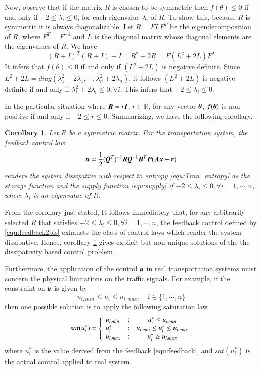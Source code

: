 \documentclass[preprint,authoryear,12pt]{elsarticle}
\renewcommand{\vec}[1]{\mbox{\boldmath$#1$}}
\newcommand{\mat}[1]{\mbox{\boldmath$#1$}}
\newtheorem{cor}{Corollary}
\begin{document}
Now, observe that if the matrix $R$ is chosen to be symmetric then $f(\theta)\leq 0$ if and only if $-2\leq\lambda_i\leq 0$, for each  eigenvalue $\lambda_i$  
 of $R$. To show this, because $R$ is symmetric it is always diagonalizable. Let $R=FLF^T$ be the eigendecomposition of $R$, where $F^T=F^{-1}$ and $L$ is the diagonal matrix whose diagonal elements are the  eigenvalues of $R$. We have 
 $$(R+I)^T(R+I)-I=R^2+2R=F(L^2+2L)F^T$$
It infers that $f(\theta)\leq 0$ if and only if $(L^2+2L)$ is negative definite. Since $L^2+2L=diag(\lambda_1^2+2\lambda_1,\cdots,\lambda_n^2+2\lambda_n)$, it follows $(L^2+2L)$ is negative definite if and only if  $\lambda_i^2+2\lambda_i \leq 0, \forall i $. This infers that  $-2\leq\lambda_i\leq 0$.

In the particular situation where $\mat{R}=r\mat{I}$, $r\in
\mathbb{R}$,
for any vector $\vec{\theta}$, $f(\vec{\theta})$ is non-positive if and only if $-2\leq r\leq 0$. Summarizing, we have the following corollary. 

\begin{cor}\label{thm:pbcc2} Let $R$ be a symmetric matrix. 
For the transportation system, the feedback control law
\begin{equation}
\label{equ:feedback2bis}
\vec{u}=\frac{1}{2}(\mat{Q}^T)^{-1}\mat{R}\mat{Q}^{-1}\mat{B}^T\mat{P}(\mat{A}
\vec{x}+\vec{r})
\end{equation}
renders the system dissipative with respect to
entropy \eqref{equ:Tran_entropy} as the storage function and the
supply function \eqref{equ:supply} if $-2\leq\lambda_i\leq 0,  \forall
i=1,\cdots,n$, where $\lambda_i$ is an eigenvalue of $R$.
 
\end{cor}

From the corollary just stated,  It follows immediately that, for any
arbitrarily selected $R$ that satisfies $-2\leq\lambda_i\leq 0,  \forall i=1,\cdots,n$, the feedback
control defined by \eqref{equ:feedback2bis} exhausts the class of control laws
which render the system dissipative. Hence, corollary \ref{thm:pbcc2} 
gives explicit but non-unique solutions of the the dissipativity based
control problem.

Furthermore, the application of the control $\vec{u}$ in real
transportation systems must concern the physical limitations on the
traffic signals. For example, if the constraint on $\vec{u}$ is given
by
$$u_{i,min}\le u_i\le u_{i,max},\quad i\in\{1,\cdots,n\}
$$
then one possible solution is to apply the following saturation law
\begin{equation}
sat(u_i^*) = \left\{ \begin{array}{l@{\quad:\quad}c}
        u_{i,min} & u_i^*\le u_{i,min}\\
        u_i^* & u_{i,min}\le u_i^*\le u_{i,max}\\
        u_{i,max} & u_i^*\ge u_{i,max}
        \end{array}\right.
\end{equation}
where $u_i^*$ is the value derived from the feedback
\eqref{equ:feedback}, and $sat(u_i^*)$ is the actual control applied
to real system.
\end{document}
